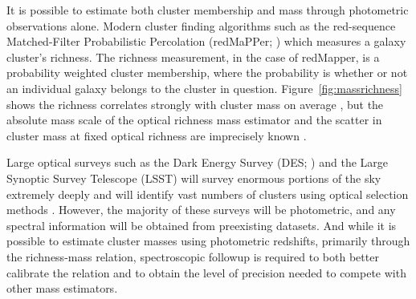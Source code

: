 It is possible to estimate both cluster membership and mass through photometric observations alone. Modern cluster finding algorithms such as the red-sequence Matched-Filter Probabilistic Percolation (redMaPPer; \citealt{Rykoff2014}) which measures a galaxy cluster's richness. The richness measurement, in the case of redMapper, is a probability weighted cluster membership, where the probability is whether or not an individual galaxy belongs to the cluster in question. Figure~\ref{fig:massrichness} shows the richness correlates strongly with cluster mass on average , but the absolute mass scale of the optical richness mass estimator and the scatter in cluster mass at fixed optical richness are imprecisely known \citep{Rykoff2012}.

Large optical surveys such as the Dark Energy Survey (DES; \citealt{DES2005}) and the Large Synoptic Survey Telescope (LSST) will survey enormous portions of the sky extremely deeply and will identify vast numbers of clusters using optical selection methods . However, the majority of these surveys will be photometric, and any spectral information will be obtained from preexisting datasets. And while it is possible to estimate cluster masses using photometric redshifts, primarily through the richness-mass relation, spectroscopic followup is required to both better calibrate the relation and to obtain the level of precision needed to compete with other mass estimators. 

